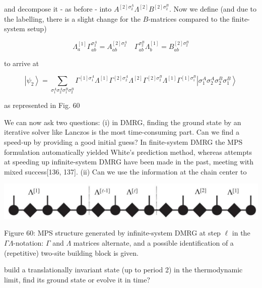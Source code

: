 \documentclass[12pt]{article}
\begin{document}
and decompose it - as before - into $A^{[2] \sigma_{2}^{A}} \Lambda^{[2]} B^{[2] \sigma_{2}^{B}}$. Now we define (and due to the labelling, there is a slight change for the $B$-matrices compared to the finite-system setup)


\begin{equation*}
\Lambda_{a}^{[1]} \Gamma_{a b}^{\sigma_{2}^{A}}=A_{a b}^{[2] \sigma_{2}^{A}} \quad \Gamma_{a b}^{\sigma_{2}^{B}} \Lambda_{b}^{[1]}=B_{a b}^{[2] \sigma_{2}^{B}} \tag{331}
\end{equation*}


to arrive at


\begin{equation*}
\left|\psi_{2}\right\rangle=\sum_{\sigma_{1}^{A} \sigma_{2}^{A} \sigma_{1}^{B} \sigma_{2}^{B}} \Gamma^{[1] \sigma_{1}^{A}} \Lambda^{[1]} \Gamma^{[2] \sigma_{2}^{A}} \Lambda^{[2]} \Gamma^{[2] \sigma_{2}^{B}} \Lambda^{[1]} \Gamma^{[1] \sigma_{1}^{B}}\left|\sigma_{1}^{A} \sigma_{2}^{A} \sigma_{2}^{B} \sigma_{1}^{B}\right\rangle \tag{332}
\end{equation*}


as represented in Fig. 60

We can now ask two questions: (i) in DMRG, finding the ground state by an iterative solver like Lanczos is the most time-consuming part. Can we find a speed-up by providing a good initial guess? In finite-system DMRG the MPS formulation automatically yielded White's prediction method, whereas attempts at speeding up infinite-system DMRG have been made in the past, meeting with mixed success[136, 137]. (ii) Can we use the information at the chain center to

\begin{center}
\includegraphics[max width=\textwidth]{2024_05_04_afc4ad226da9ccfe0ac8g-107}
\end{center}

Figure 60: MPS structure generated by infinite-system DMRG at step $\ell$ in the $\Gamma \Lambda$-notation: $\Gamma$ and $\Lambda$ matrices alternate, and a possible identification of a (repetitive) two-site building block is given.

build a translationally invariant state (up to period 2) in the thermodynamic limit, find its ground state or evolve it in time?
\end{document}
